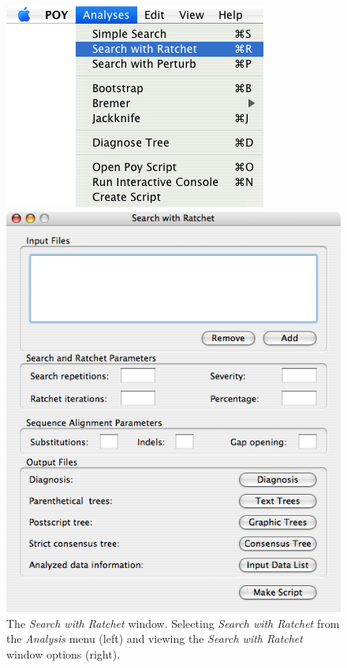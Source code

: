 \begin{figure}
\centering
\begin{minipage}[c]{0.48\textwidth}
   		\includegraphics[width=\textwidth]{doc/figures/searchwithratchet_menu.jpg}
\end{minipage}
\quad
\begin{minipage}[c]{0.48\textwidth}
	   	\includegraphics[width=\textwidth]{doc/figures/searchwithratchet_window.jpg}
   	\end{minipage}
	
\caption{The \emph{Search with Ratchet} window. Selecting \emph{Search with Ratchet} from the \emph{Analysis} menu (left) and viewing the \emph{Search with Ratchet} window options (right).}
\label{fig:search_with_ratchet_window}
\end{figure}

